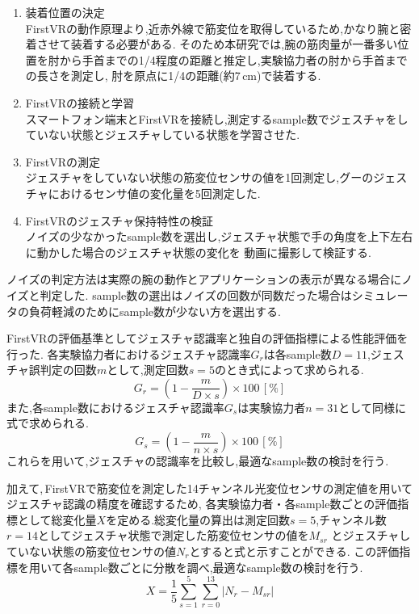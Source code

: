 \documentclass{ltjsreport}
\begin{document}
		\begin{enumerate}
			\item 装着位置の決定\\
				FirstVRの動作原理より,近赤外線で筋変位を取得しているため,かなり腕と密着させて装着する必要がある.
				そのため本研究では,腕の筋肉量が一番多い位置を肘から手首までの1/4程度の距離と推定し,実験協力者の肘から手首までの長さを測定し,
				肘を原点に1/4の距離(約7\,cm)で装着する.
			\item FirstVRの接続と学習\\
				スマートフォン端末とFirstVRを接続し,測定するsample数でジェスチャをしていない状態とジェスチャしている状態を学習させた.
			\item FirstVRの測定\\
				ジェスチャをしていない状態の筋変位センサの値を1回測定し,グーのジェスチャにおけるセンサ値の変化量を5回測定した.
			\item FirstVRのジェスチャ保持特性の検証\\
				ノイズの少なかったsample数を選出し,ジェスチャ状態で手の角度を上下左右に動かした場合のジェスチャ状態の変化を
				動画に撮影して検証する.
		\end{enumerate}

		ノイズの判定方法は実際の腕の動作とアプリケーションの表示が異なる場合にノイズと判定した.
		sample数の選出はノイズの回数が同数だった場合はシミュレータの負荷軽減のためにsample数が少ない方を選出する.

		FirstVRの評価基準としてジェスチャ認識率と独自の評価指標による性能評価を行った.
		各実験協力者におけるジェスチャ認識率$G_{r}$は各sample数$D = 11$,ジェスチャ誤判定の回数$m$として,測定回数$s = 5$のとき式によって求められる.
		\begin{equation}
			\label{eq:gestureprobability1}
			G_{r} = \left( 1-\frac{m}{D \times s} \right) \times 100 \, [\%]
		\end{equation}
		また,各sample数におけるジェスチャ認識率$G_{s}$は実験協力者$n = 31$として同様に式で求められる.
		\begin{equation}
			\label{eq:gestureprobability2}
			G_{s} = \left( 1-\frac{m}{n \times s} \right) \times 100 \, [\%]
		\end{equation}
		これらを用いて,ジェスチャの認識率を比較し,最適なsample数の検討を行う.
		
		加えて,\,FirstVRで筋変位を測定した14チャンネル光変位センサの測定値を用いてジェスチャ認識の精度を確認するため,
		各実験協力者・各sample数ごとの評価指標として総変化量$X$を定める.総変化量の算出は測定回数$s = 5$,チャンネル数$r = 14$としてジェスチャ状態で測定した筋変位センサの値を$M_{{s}{r}}$
		とジェスチャしていない状態の筋変位センサの値$N_{r}$とすると式と示すことができる.
		この評価指標を用いて各sample数ごとに分散を調べ,最適なsample数の検討を行う.
		\begin{equation}
			\label{eq:originaldata}
			X = \frac{1}{5} \sum_{s = 1}^{5} \sum_{r = 0}^{13} |N_{r} - M_{{s}{r}}|
		\end{equation}
		
\end{document}

